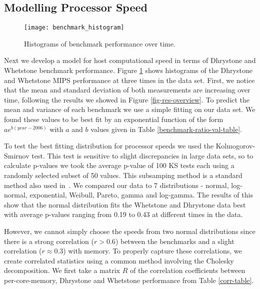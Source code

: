 \documentclass[conference]{IEEEtran}
\begin{document}
\subsection{Modelling Processor Speed}
\label{sec-model-speed}

\begin{figure}[!t]
\centering
\texttt{[image: benchmark\_histogram]}
\caption{Histograms of benchmark performance over time.}
\label{fig-benchmark-hist}
\end{figure}

Next we develop a model for host computational speed in
terms of Dhrystone and Whetstone benchmark performance.
Figure \ref{fig-benchmark-hist} shows histograms of the
Dhrystone and Whetstone MIPS performance at three times in
the data set.  First, we notice that the mean and standard
deviation of both measurements are increasing over time,
following the results we showed in Figure
\ref{fig-res-overview}.  To predict the mean and variance of
each benchmark we use a simple fitting on our data set.  We
found these values to be best fit by an exponential function
of the form $a e^{b (year-2006)}$ with $a$ and $b$ values
given in Table \ref{benchmark-ratio-val-table}.

To test the best fitting distribution for processor speeds
we used the Kolmogorov-Smirnov test.  This test is sensitive
to slight discrepancies in large data sets, so to calculate
p-values we took the average p-value of 100 KS tests each
using a randomly selected subset of 50 values. This
subsamping method is a standard method also used
in~\cite{Javadi:2009p7323,Nurmi:2005p333}.  We compared
our data to 7 distributions - normal, log-normal, exponential,
Weibull, Pareto, gamma and log-gamma. The results of
this show that the normal distribution fits the Whetstone
and Dhrystone data best with average p-values ranging from
0.19 to 0.43 at different times in the data.

However, we cannot simply choose the speeds from two normal
distributions since there is a strong correlation ($r >
0.6$) between the benchmarks and a slight correlation
($r \approx 0.3$) with memory.  To properly capture these correlations,
we create correlated statistics using a common method
involving the Cholesky decomposition.  We first take a
matrix $R$ of the correlation coefficients between
per-core-memory, Dhrystone and Whetstone performance from
Table \ref{corr-table}.
\end{document}
